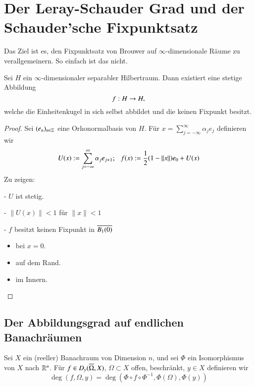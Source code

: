 \section{Der Leray-Schauder Grad und der Schauder'sche Fixpunktsatz}

Das Ziel ist es, den Fixpunktsatz von Brouwer auf $\infty$-dimensionale Räume zu verallgemeinern.
So einfach ist das nicht.

\begin{theorem}[Kakutani]\label{3.1}
    Sei $H$ ein $\infty$-dimensionaler separabler Hilbertraum. Dann existiert eine stetige Abbildung
    \[
        f:H\rightarrow H,
    \]
    welche die Einheitenkugel in sich selbst abbildet und die keinen Fixpunkt besitzt.
\end{theorem}

\begin{proof}
    Sei $(e_n)_{n\in \mathbb{Z}}$ eine Orhonormalbasis von $H$. Für $x=\sum_{j=-\infty}^\infty\alpha_je_j$
    definieren wir
    \[
        U(x):=\sum_{j=-\infty}^\infty \alpha _je_{j+1};\hspace{.25cm} f(x):=\frac12 (1-\|x\|)e_0+U(x)
    \]
    Zu zeigen:
    \begin{description}
    \item{-}
    $U$ ist stetig.
    \item{-}
    $\|U(x)\|<1$ für $\|x\|<1$
    \item{-}
    $f$ besitzt keinen Fixpunkt in $\overline{B_1(0)}$
    \begin{itemize}
        \item bei $x=0$.
        \item auf dem Rand.
        \item im Innern.
    \end{itemize}
    \end{description}
    \[  \]
\end{proof}

\subsection{Der Abbildungsgrad auf endlichen Banachräumen}

\begin{defi}\label{3.2}
    Sei $X$ ein (reeller) Banachraum von Dimension $n$, und sei $\Phi$ ein Isomorphismus von $X$ nach 
    $\mathbb{R}^n$. Für $f\in D_y(\overline \Omega,X)$, $\Omega \subset X$ offen, beschränkt, $y\in X$ definieren wir
    \[
        \deg(f,\Omega,y)=\deg(\Phi\circ f \circ \Phi^{-1},\Phi(\Omega),\Phi(y))
    \]
\end{defi}

